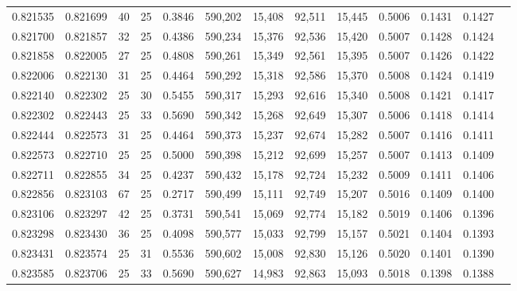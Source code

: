 \begin{tabular}{rrrrrrrrrrrrr}
0.821535 & 0.821699 &    40 &  25 &                                     0.3846 & 590,202 &  15,408 &  92,511 &  15,445 & 0.5006 & 0.1431 & 0.1427 \\
0.821700 & 0.821857 &    32 &  25 &                                     0.4386 & 590,234 &  15,376 &  92,536 &  15,420 & 0.5007 & 0.1428 & 0.1424 \\
0.821858 & 0.822005 &    27 &  25 &                                     0.4808 & 590,261 &  15,349 &  92,561 &  15,395 & 0.5007 & 0.1426 & 0.1422 \\
0.822006 & 0.822130 &    31 &  25 &                                     0.4464 & 590,292 &  15,318 &  92,586 &  15,370 & 0.5008 & 0.1424 & 0.1419 \\
0.822140 & 0.822302 &    25 &  30 &                                     0.5455 & 590,317 &  15,293 &  92,616 &  15,340 & 0.5008 & 0.1421 & 0.1417 \\
0.822302 & 0.822443 &    25 &  33 &                                     0.5690 & 590,342 &  15,268 &  92,649 &  15,307 & 0.5006 & 0.1418 & 0.1414 \\
0.822444 & 0.822573 &    31 &  25 &                                     0.4464 & 590,373 &  15,237 &  92,674 &  15,282 & 0.5007 & 0.1416 & 0.1411 \\
0.822573 & 0.822710 &    25 &  25 &                                     0.5000 & 590,398 &  15,212 &  92,699 &  15,257 & 0.5007 & 0.1413 & 0.1409 \\
0.822711 & 0.822855 &    34 &  25 &                                     0.4237 & 590,432 &  15,178 &  92,724 &  15,232 & 0.5009 & 0.1411 & 0.1406 \\
0.822856 & 0.823103 &    67 &  25 &                                     0.2717 & 590,499 &  15,111 &  92,749 &  15,207 & 0.5016 & 0.1409 & 0.1400 \\
0.823106 & 0.823297 &    42 &  25 &                                     0.3731 & 590,541 &  15,069 &  92,774 &  15,182 & 0.5019 & 0.1406 & 0.1396 \\
0.823298 & 0.823430 &    36 &  25 &                                     0.4098 & 590,577 &  15,033 &  92,799 &  15,157 & 0.5021 & 0.1404 & 0.1393 \\
0.823431 & 0.823574 &    25 &  31 &                                     0.5536 & 590,602 &  15,008 &  92,830 &  15,126 & 0.5020 & 0.1401 & 0.1390 \\
0.823585 & 0.823706 &    25 &  33 &                                     0.5690 & 590,627 &  14,983 &  92,863 &  15,093 & 0.5018 & 0.1398 & 0.1388 \\

\end{tabular}
